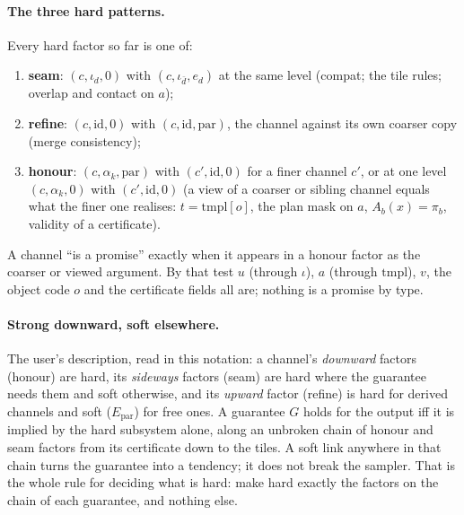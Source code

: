 \documentclass[11pt]{article}
\newcommand{\1}{\mathds{1}}
\begin{document}
\paragraph{The three hard patterns.} Every hard factor so far is one of:
\begin{enumerate}
  \item \textbf{seam}: $(c, \iota_d, 0)$ with $(c, \iota_{\bar d}, e_d)$ at the same level
        (compat; the tile rules; overlap and contact on $a$);
  \item \textbf{refine}: $(c, \mathrm{id}, 0)$ with $(c, \mathrm{id}, \mathrm{par})$, the
        channel against its own coarser copy (merge consistency);
  \item \textbf{honour}: $(c, \alpha_k, \mathrm{par})$ with $(c', \mathrm{id}, 0)$ for a finer
        channel $c'$, or at one level $(c, \alpha_k, 0)$ with $(c', \mathrm{id}, 0)$
        (a view of a coarser or sibling channel equals what the finer one
        realises: $t = \mathrm{tmpl}[o]$, the plan mask on $a$, $A_b(x) = \pi_b$,
        validity of a certificate).
\end{enumerate}
A channel ``is a promise'' exactly when it appears in a honour factor as the
coarser or viewed argument. By that test $u$ (through $\iota$), $a$ (through
$\mathrm{tmpl}$), $v$, the object code $o$ and the certificate fields all are;
nothing is a promise by type.

\paragraph{Strong downward, soft elsewhere.} The user's description, read in
this notation: a channel's \emph{downward} factors (honour) are hard, its
\emph{sideways} factors (seam) are hard where the guarantee needs them and soft
otherwise, and its \emph{upward} factor (refine) is hard for derived channels
and soft ($E_{\mathrm{par}}$) for free ones. A guarantee $G$ holds for the output
iff it is implied by the hard subsystem alone, along an unbroken chain of
honour and seam factors from its certificate down to the tiles. A soft link
anywhere in that chain turns the guarantee into a tendency; it does not break
the sampler. That is the whole rule for deciding what is hard: make hard
exactly the factors on the chain of each guarantee, and nothing else.
\end{document}
